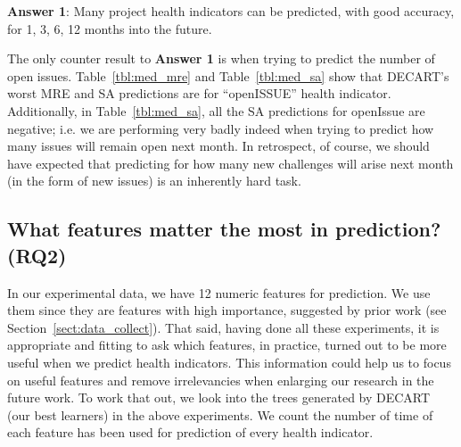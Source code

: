\documentclass[sigconf,anonymous,review]{acmart}
\begin{document}
  
\begin{blockquote}
\noindent
\textbf{Answer 1}: Many project health indicators can be predicted, with good accuracy, for 1, 3, 6, 12   months into the future.
\end{blockquote}

The only counter result to {\bf Answer 1} is when trying to  predict  the number of open 
issues.
Table~\ref{tbl:med_mre} and 
Table~\ref{tbl:med_sa} show that 
DECART's worst MRE and SA predictions are for ``openISSUE'' health indicator.
Additionally, in  Table~\ref{tbl:med_sa}, all the SA predictions for openIssue are negative; i.e.   we are performing very badly indeed when trying to predict how many issues will remain open next month. In retrospect, of course, we should have expected that predicting for how many new challenges will arise next month (in the form of new issues) is an inherently hard task. 



\subsection{What features matter the most in prediction? (RQ2)}
In our experimental data, we have 12 numeric features for prediction.
We use them since they are features with high importance, suggested by prior work (see Section~\ref{sect:data_collect}).
That said, having done all these experiments, it is appropriate and fitting to ask which features, in practice, turned out to be more useful when we predict health indicators.   This information could help us to focus on useful features and remove irrelevancies when enlarging our research in the future work. To work that out, we look into the trees generated by DECART
(our best learners) in the above experiments.   We count the number of time of each feature has been used for prediction of every health indicator. 
\end{document}
